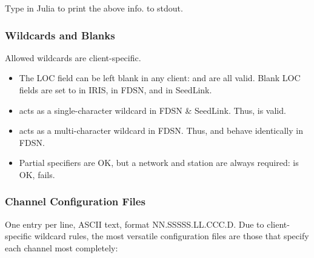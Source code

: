 \documentclass[letterpaper,11pt,english]{sphinxmanual}
\begin{document}
\begin{fulllineitems}
\label{\detokenize{src/Appendices/web_syntax:chanspec}}
\end{fulllineitems}


Type  in Julia to print the above info. to stdout.


\subsubsection{Wildcards and Blanks}
\label{\detokenize{src/Appendices/web_syntax:wildcards-and-blanks}}
Allowed wildcards are client-specific.
\begin{itemize}
\item {} 
The LOC field can be left blank in any client:  and  are all valid. Blank LOC fields are set to \sphinxcode{\sphinxupquote{-{-}}} in IRIS, \sphinxcode{\sphinxupquote{*}} in FDSN, and  in SeedLink.

\item {} 
 acts as a single-character wildcard in FDSN \& SeedLink. Thus,  is valid.

\item {} 
\sphinxcode{\sphinxupquote{*}} acts as a multi-character wildcard in FDSN. Thus,  and  behave identically in FDSN.

\item {} 
Partial specifiers are OK, but a network and station are always required:  is OK,  fails.

\end{itemize}


\subsubsection{Channel Configuration Files}
\label{\detokenize{src/Appendices/web_syntax:channel-configuration-files}}\label{\detokenize{src/Appendices/web_syntax:ccfg}}
One entry per line, ASCII text, format NN.SSSSS.LL.CCC.D. Due to client-specific wildcard rules, the most versatile configuration files are those that specify each channel most completely:
\end{document}
